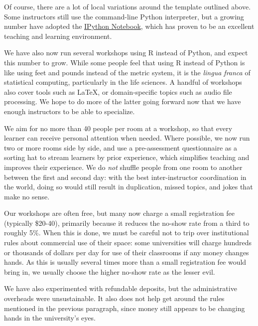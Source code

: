 \documentclass[10pt,a4paper,twocolumn]{article}
\begin{document}
Of course, there are a lot of local variations around the template
outlined above. Some instructors still use the command-line Python
interpreter, but a growing number have adopted the
\href{http://ipython.org/notebook.html}{IPython Notebook}, which has
proven to be an excellent teaching and learning environment.

We have also now run several workshops using R instead of Python, and
expect this number to grow. While some people feel that using R instead
of Python is like using feet and pounds instead of the metric system, it
is the \emph{lingua franca} of statistical computing, particularly in
the life sciences. A handful of workshops also cover tools such as
LaTeX, or domain-specific topics such as audio file processing. We hope
to do more of the latter going forward now that we have enough
instructors to be able to specialize.

We aim for no more than 40 people per room at a workshop, so that
every learner can receive personal attention when needed.  Where
possible, we now run two or more rooms side by side, and use a
pre-assessment questionnaire as a sorting hat to stream learners by
prior experience, which simplifies teaching and improves their
experience.  We do \emph{not} shuffle people from one room to another
between the first and second day: with the best inter-instructor
coordination in the world, doing so would still result in duplication,
missed topics, and jokes that make no sense.

Our workshops are often free, but many now charge a small registration
fee (typically \$20-40), primarily because it reduces the no-show rate
from a third to roughly 5\%.  When this is done, we must be careful
not to trip over institutional rules about commercial use of their
space: some universities will charge hundreds or thousands of dollars
per day for use of their classrooms if any money changes hands.  As
this is usually several times more than a small registration fee would
bring in, we usually choose the higher no-show rate as the lesser
evil.

We have also experimented with refundable deposits, but the
administrative overheads were unsustainable.  It also does not help
get around the rules mentioned in the previous paragraph, since money
still appears to be changing hands in the university's eyes.
\end{document}
